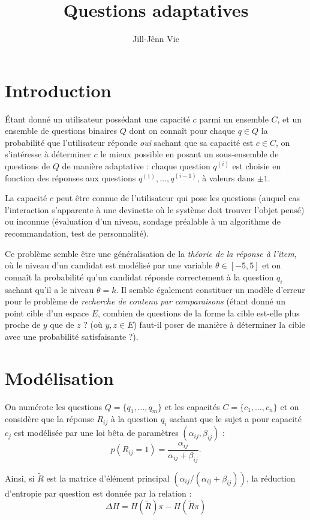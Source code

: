 \documentclass[a4paper,12pt]{article}
\title{Questions adaptatives}
\author{Jill-Jênn Vie}
\begin{document}
\maketitle

\section{Introduction}

Étant donné un utilisateur possédant une capacité $c$ parmi un ensemble $C$, et un ensemble de questions binaires $Q$ dont on connaît pour chaque $q \in Q$ la probabilité que l'utilisateur réponde \emph{oui} sachant que sa capacité est $c \in C$, on s'intéresse à déterminer $c$ le mieux possible en posant un sous-ensemble de questions de $Q$ de manière adaptative : chaque question $q^{(i)}$ est choisie en fonction des réponses aux questions $q^{(1)}, \ldots, q^{(i - 1)}$, à valeurs dans $\pm 1$.

La capacité $c$ peut être connue de l'utilisateur qui pose les questions (auquel cas l'interaction s'apparente à une devinette où le système doit trouver l'objet pensé) ou inconnue (évaluation d'un niveau, sondage préalable à un algorithme de recommandation, test de personnalité).

Ce problème semble être une généralisation de la \emph{théorie de la réponse à l'item}, où le niveau d'un candidat est modélisé par une variable $\theta \in [-5, 5]$ et on connaît la probabilité qu'un candidat réponde correctement à la question $q_i$ sachant qu'il a le niveau $\theta = k$. Il semble également constituer un modèle d'erreur pour le problème de \emph{recherche de contenu par comparaisons} (étant donné un point cible d'un espace $E$, combien de questions de la forme \og la cible est-elle plus proche de $y$ que de $z$ ? \fg{} (où $y, z \in E$) faut-il poser de manière à déterminer la cible avec une probabilité satisfaisante ?).

\section{Modélisation}

On numérote les questions $Q = \{q_1, \ldots, q_m\}$ et les capacités $C = \{c_1, \ldots, c_n\}$ et on considère que la réponse $R_{ij}$ à la question $q_i$ sachant que le sujet a pour capacité $c_j$ est modélisée par une loi bêta de paramètres $(\alpha_{ij}, \beta_{ij})$ :
\[ p(R_{ij} = 1) = \frac{\alpha_{ij}}{\alpha_{ij} + \beta_{ij}}. \]

Ainsi, si $\tilde{R}$ est la matrice d'élément principal $(\alpha_{ij} / (\alpha_{ij} + \beta_{ij}))$, la réduction d'entropie par question est donnée par la relation :
\[ \Delta H = H(\tilde{R}) \pi - H(\tilde{R} \pi) \]
\end{document}
